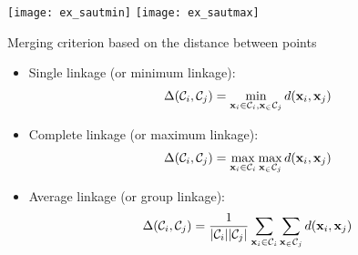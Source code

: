 \documentclass{beamer}\usepackage[]{graphicx}\usepackage[]{color}
\begin{document}
\begin{frame}

  \begin{center}
    \texttt{[image: ex\_sautmin]}
    \hspace*{.1\textwidth}
    \texttt{[image: ex\_sautmax]}
  \end{center}

  \begin{block}{Merging criterion based on the distance between points}
    \begin{itemize}
      \item Single linkage (or minimum linkage):
      \begin{align*}
        \Delta(\mathcal{C}_i, \mathcal{C}_j) = \min_{\mathbf{x}_i \in \mathcal{C}_i, \mathbf{x}_ \in \mathcal{C}_j} d(\mathbf{x}_i, \mathbf{x}_j)
      \end{align*}
      \item Complete linkage (or maximum linkage):
      \begin{align*}
        \Delta(\mathcal{C}_i, \mathcal{C}_j) = \max_{\mathbf{x}_i \in \mathcal{C}_i} \max_{\mathbf{x}_ \in \mathcal{C}_j}d(\mathbf{x}_i, \mathbf{x}_j)
    \end{align*}
    \item Average linkage (or group linkage):
      \begin{align*}
        \Delta(\mathcal{C}_i, \mathcal{C}_j) = \frac{1}{|\mathcal{C}_i||\mathcal{C}_j|} \sum_{\mathbf{x}_i \in \mathcal{C}_i}\sum_{\mathbf{x}_ \in\mathcal{C}_j} d(\mathbf{x}_i, \mathbf{x}_j)
      \end{align*}
    \end{itemize}
  \end{block}

\end{frame}
\end{document}
